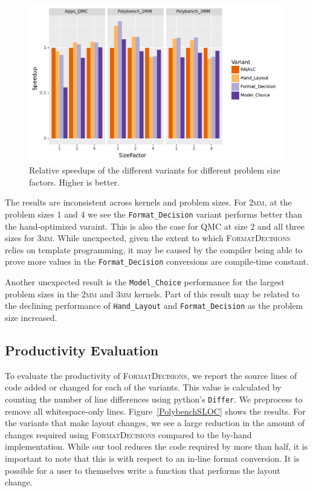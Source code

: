 \documentclass[sigconf,review=true]{acmart}
\newcommand{\FormatDecisions}[0]{{\textsc{FormatDecisions}}}
\begin{document}
\begin{figure}
	\includegraphics[width=\columnwidth]{speedups.pdf}
	\caption{Relative speedups of the different variants for different problem size factors. Higher is better.}
	\label{fig:speedups}
\end{figure}

The results are inconsistent across kernels and problem sizes. 
For \textsc{2mm}, at the problem sizes 1 and 4 we see the \verb.Format_Decision. variant performs better than the hand-optimized varaint. 
This is also the case for QMC at size 2 and all three sizes for \textsc{3mm}.
While unexpected, given the extent to which \FormatDecisions{} relies on template programming, it may be caused by the compiler being able to prove more values in the \verb.Format_Decision. conversions are compile-time constant. 

Another unexpected result is the \verb.Model_Choice. performance for the largest problem sizes in the \textsc{2mm} and \textsc{3mm} kernels.
Part of this result may be related to the declining performance of \verb.Hand_Layout. and \verb.Format_Decision. as the problem size increased.



\subsection{Productivity Evaluation}

To evaluate the productivity of \textsc{FormatDecisions}, we report the source lines of code added or changed for each of the variants.
This value is calculated by counting the number of line differences using python's \verb.Differ.. 
We preprocess to remove all whitespace-only lines.
Figure~\ref{PolybenchSLOC} shows the results.
For the variants that make layout changes, we see a large reduction in the amount of changes required using \FormatDecisions{} compared to the by-hand implementation. 
While our tool reduces the code required by more than half, it is important to note that this is with respect to an in-line format conversion.
It is possible for a user to themselves write a function that performs the layout change.
\end{document}

